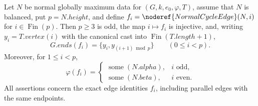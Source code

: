 \begin{helper}
Let $N$ be normal globally maximum data for $(G,k,e_0,\varphi,T)$,
assume that $N$ is balanced, put $p=N.height$, and define
$f_i=\noderef{NormalCycleEdge}(N,i)$ for $i\in\operatorname{Fin}(p)$.
Then $p\geq3$ is odd, the map $i\mapsto f_i$ is injective, and, writing
$y_i=T.vertex(i)$ with the canonical cast into
$\operatorname{Fin}(T.length+1)$,
\[
 G.ends(f_i)=\{y_i,y_{(i+1)\bmod p}\}\qquad(0\leq i<p).
\]
Moreover, for $1\leq i<p$,
\[
 \varphi(f_i)=
 \begin{cases}
  \operatorname{some}(N.alpha),&i\text{ odd},\\
  \operatorname{some}(N.beta),&i\text{ even}.
 \end{cases}
\]
All assertions concern the exact edge identities $f_i$, including parallel
edges with the same endpoints.
\end{helper}
